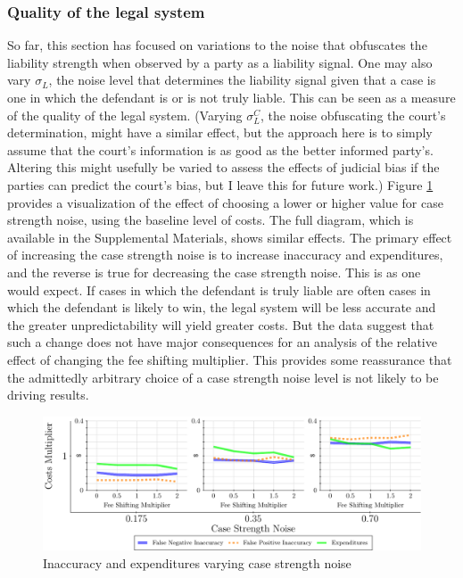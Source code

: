 \documentclass{article}
\begin{document}
\subsubsection{Quality of the legal system}

So far, this section has focused on variations to the noise that obfuscates the liability strength when observed by a party as a liability signal. One may also vary $\sigma_{L}$, the noise level that determines the liability signal given that a case is one in which the defendant is or is not truly liable. This can be seen as a measure of the quality of the legal system. (Varying $\sigma_{L}^C$, the noise obfuscating the court's determination, might have a similar effect, but the approach here is to simply assume that the court's information is as good as the better informed party's. Altering this might usefully be varied to assess the effects of judicial bias if the parties can predict the court's bias, but I leave this for future work.)  Figure \ref{fig:accexp_qualitylegalsystem} provides a visualization of the effect of choosing a lower or higher value for case strength noise, using the baseline level of costs. The full diagram, which is available in the Supplemental Materials, shows similar effects. The primary effect of increasing the case strength noise is to increase inaccuracy and expenditures, and the reverse is true for decreasing the case strength noise. This is as one would expect. If cases in which the defendant is truly liable are often cases in which the defendant is likely to win, the legal system will be less accurate and the greater unpredictability will yield greater costs. But the data suggest that such a change does not have major consequences for an analysis of the relative effect of changing the fee shifting multiplier. This provides some reassurance that the admittedly arbitrary choice of a case strength noise level is not likely to be driving results.

\begin{figure}[h!]
\centering
\includegraphics[scale=0.50, trim={0in 0in 0in 0in}, clip]{../Figures/Accuracy and Expenditures Varying Case Strength Noise Costs 1.pdf}
\caption{Inaccuracy and expenditures varying case strength noise}
\label{fig:accexp_qualitylegalsystem}
\end{figure}
\end{document}
